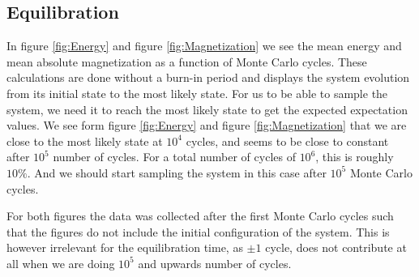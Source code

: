 \documentclass[%
reprint,
nofootinbib,
amsmath,amssymb,
aps,
]{revtex4-1}
\begin{document}
\subsection{Equilibration} %
In figure \ref{fig:Energy} and figure \ref{fig:Magnetization} we see the mean energy and mean absolute magnetization as a function of Monte Carlo cycles. These calculations are done without a burn-in period and displays the system evolution from its initial state to the most likely state. For us to be able to sample the system, we need it to reach the most likely state to get the expected expectation values. 
We see form figure \ref{fig:Energy} and figure \ref{fig:Magnetization} that we are close to the most likely state at $10^4$ cycles, and seems to be close to constant after $10^5$ number of cycles. For a total number of cycles of $10^6$, this is roughly $10\%$. And we should start sampling the system in this case after $10^5$ Monte Carlo cycles. 

For both figures the data was collected after the first Monte Carlo cycles such that the figures do not include the initial configuration of the system. This is however irrelevant for the equilibration time, as $\pm 1$ cycle, does not contribute at all when we are doing $10^5$ and upwards number of cycles. 
\end{document}
